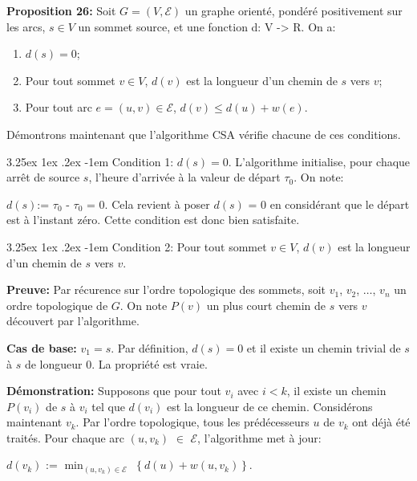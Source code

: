 \documentclass[12pt]{article}
\makeatletter
\renewcommand\paragraph{\@startsection{paragraph}{5}{\z@}%
  {3.25ex \@plus1ex \@minus.2ex}%
  {-1em}%
  {\normalfont\normalsize\bfseries}}
\makeatother
\begin{document}
\textbf{Proposition 26:} Soit $G = (V, \mathcal{E})$ un graphe orienté, pondéré positivement sur les arcs, $s \in V$ un sommet source, et une fonction 
d: V -> R.
On a:
\begin{enumerate}
    \item $d(s) = 0$;
    \item Pour tout sommet $v \in V$, $d(v)$ est la longueur d'un chemin de $s$ vers $v$;
    \item Pour tout arc $e = (u, v) \in \mathcal{E}$, $d(v) \leq d(u) + w(e)$.
\end{enumerate}

\noindent Démontrons maintenant que l'algorithme CSA vérifie chacune de ces conditions.

\paragraph{Condition 1:}
 $d(s) = 0$.
L'algorithme initialise, pour chaque arrêt de source $s$, l'heure d'arrivée à la valeur de départ $\tau_0$. On note:

$d(s)$:= $\tau_0$ - $\tau_0$ = 0.
Cela revient à poser $d(s)$ = 0 en considérant que le départ est à l'instant zéro. Cette condition est donc bien satisfaite.

\paragraph{Condition 2:} 
Pour tout sommet $v \in V$, $d(v)$ est la longueur d'un chemin de $s$ vers $v$.

\medskip

\textbf{Preuve:}
Par récurence sur l'ordre topologique des sommets,
soit $v_1$, $v_2$, $\dots$, $v_n$ un ordre topologique de $G$. On note $P(v)$ un plus court chemin de $s$ vers $v$ découvert par l'algorithme.

\textbf{Cas de base:} $v_1 = s$. Par définition, $d(s) = 0$ et il existe un chemin trivial de $s$ à $s$ de longueur 0. La propriété est vraie.

\textbf{Démonstration:} Supposons que pour tout $v_i$ avec $i < k$, il existe un chemin $P(v_i)$ de $s$ à $v_i$ tel que $d(v_i)$ est la longueur de ce 
chemin. Considérons maintenant $v_k$. Par l'ordre topologique, tous les prédécesseurs $u$ de $v_k$ ont déjà été traités. Pour chaque arc $(u, v_k)$ $\in$ $\mathcal{E}$, l'algorithme met à jour:


$d(v_k)$ := $\min_{(u, v_k) \in \mathcal{E}}$ $\left\{ d(u) + w(u, v_k) \right\}$.
\end{document}
